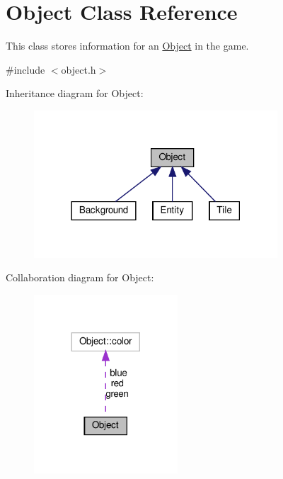 \hypertarget{classObject}{}\section{Object Class Reference}
\label{classObject}


This class stores information for an \hyperlink{classObject}{Object} in the game.  




{\ttfamily \#include $<$object.\+h$>$}



Inheritance diagram for Object\+:\nopagebreak
\begin{figure}[H]
\begin{center}
\leavevmode
\includegraphics[width=258pt]{classObject__inherit__graph}
\end{center}
\end{figure}


Collaboration diagram for Object\+:\nopagebreak
\begin{figure}[H]
\begin{center}
\leavevmode
\includegraphics[width=152pt]{classObject__coll__graph}
\end{center}
\end{figure}

